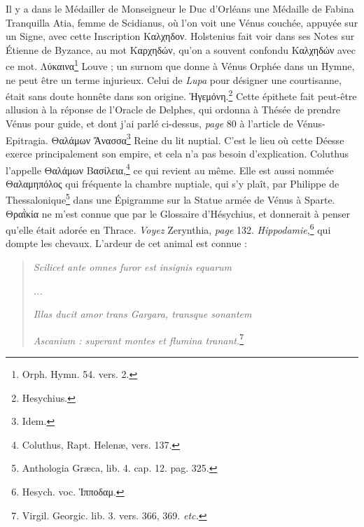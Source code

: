 \documentclass[a4paper, 18pt, oneside]{article}
\begin{document}
Il y a dans le Médailler de Monseigneur le Duc d'Orléans une Médaille de Fabina Tranquilla Atia, femme de Scidianus, où l'on voit une Vénus couchée, appuyée sur un Signe, avec cette Inscription Καλχηδον. Holstenius fait voir dans ses Notes sur Étienne de Byzance, au mot Καρχηδών, qu'on a souvent confondu Καλχηδών avec ce mot. Λύκαινα\footnote{Orph. Hymn. 54. vers. 2.} Louve ; un surnom que donne à Vénus Orphée dans un Hymne, ne peut être un terme injurieux. Celui de \emph{Lupa} pour désigner une courtisanne, était sans doute honnête dans son origine. Ἡγεμόνη.\footnote{Hesychius.} Cette épithete fait peut-être allusion à la réponse de l'Oracle de Delphes, qui ordonna à Thésée de prendre Vénus pour guide, et dont j'ai parlé ci-dessus, \emph{page} 80 à l'article de Vénus-Epitragia. Θαλάμων Ἄνασσα\footnote{Idem.} Reine du lit nuptial. C'est le lieu où cette Déesse exerce principalement son empire, et cela n'a pas besoin d'explication. Coluthus l'appelle Θαλάμων Βασίλεια,\footnote{Coluthus, Rapt. Helenæ, vers. 137.} ce qui revient au même. Elle est aussi nommée Θαλαμηπόλος qui fréquente la chambre nuptiale, qui s'y plaît, par Philippe de Thessalonique\footnote{Anthologia Græca, lib. 4. cap. 12. pag. 325.} dans une Épigramme sur la Statue armée de Vénus à Sparte. Θραῒκία ne m'est connue que par le Glossaire d'Hésychius, et donnerait à penser qu'elle était adorée en Thrace. \emph{Voyez} Zerynthia, \emph{page} 132. \emph{Hippodamie},\footnote{Hesych. voc. Ἱπποδαμ.} qui dompte les chevaux. L'ardeur de cet animal est connue :
\begin{quotation}
\emph{Scilicet ante omnes furor est insignis equarum}

\emph{...}

\emph{Illas ducit amor trans Gargara, transque sonantem}

\emph{Ascanium : superant montes et flumina tranant.}\footnote{Virgil. Georgic. lib. 3. vers. 366, 369. \emph{etc.}}
\end{quotation}
\end{document}
